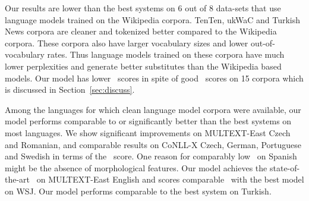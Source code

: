 Our results are lower than the best systems on 6 out of 8 data-sets
that use language models trained on the Wikipedia corpora.  TenTen,
ukWaC and Turkish News corpora are cleaner and tokenized better
compared to the Wikipedia corpora.  These corpora also have larger
vocabulary sizes and lower out-of-vocabulary rates.  Thus language
models trained on these corpora have much lower perplexities and
generate better substitutes than the Wikipedia based models.  Our
model has lower \vm\ scores in spite of good \mto\ scores on 15
corpora which is discussed in Section~\ref{sec:discuss}.

Among the languages for which clean language model corpora were
available, our model performs comparable to or significantly better
than the best systems on most languages.  We show significant
improvements on MULTEXT-East Czech and Romanian, and comparable
results on CoNLL-X Czech, German, Portuguese and Swedish in terms of the
\mto\ score.  One reason for comparably low \mto\ on Spanish might be
the absence of morphological features.  Our model achieves the
state-of-the-art \mto\ on MULTEXT-East English and scores comparable
\mto\ with the best model on WSJ.  Our model performs comparable to
the best system on Turkish.



